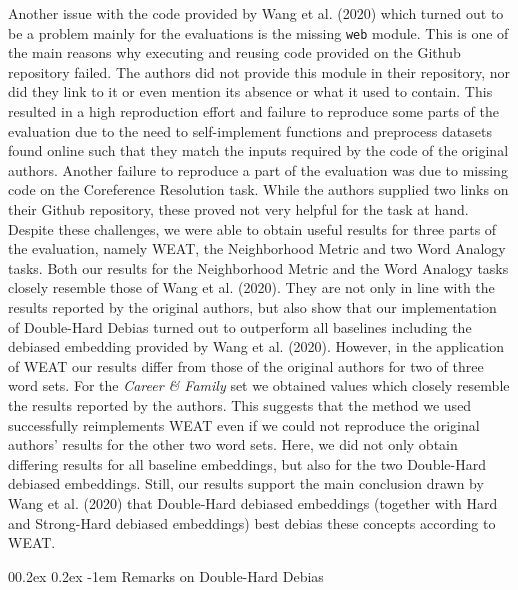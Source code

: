 \documentclass[
  english,
  man,floatsintext]{apa6}
\makeatletter
\let\oldparagraph\paragraph
\renewcommand{\paragraph}[1]{\oldparagraph{#1}\mbox{}}
\renewcommand{\paragraph}{\@startsection{paragraph}{4}{\parindent}%
  {0\baselineskip \@plus 0.2ex \@minus 0.2ex}%
  {-1em}%
  {\normalfont\normalsize\bfseries\itshape\typesectitle}}
\makeatother
\begin{document}
Another issue with the code provided by Wang et al. (2020) which turned out to be a problem mainly for the evaluations is the missing \texttt{web} module. This is one of the main reasons why executing and reusing code provided on the Github repository failed. The authors did not provide this module in their repository, nor did they link to it or even mention its absence or what it used to contain. This resulted in a high reproduction effort and failure to reproduce some parts of the evaluation due to the need to self-implement functions and preprocess datasets found online such that they match the inputs required by the code of the original authors.
Another failure to reproduce a part of the evaluation was due to missing code on the Coreference Resolution task. While the authors supplied two links on their Github repository, these proved not very helpful for the task at hand.
Despite these challenges, we were able to obtain useful results for three parts of the evaluation, namely WEAT, the Neighborhood Metric and two Word Analogy tasks. Both our results for the Neighborhood Metric and the Word Analogy tasks closely resemble those of Wang et al. (2020). They are not only in line with the results reported by the original authors, but also show that our implementation of Double-Hard Debias turned out to outperform all baselines including the debiased embedding provided by Wang et al. (2020). However, in the application of WEAT our results differ from those of the original authors for two of three word sets. For the \emph{Career \& Family} set we obtained values which closely resemble the results reported by the authors. This suggests that the method we used successfully reimplements WEAT even if we could not reproduce the original authors' results for the other two word sets. Here, we did not only obtain differing results for all baseline embeddings, but also for the two Double-Hard debiased embeddings. Still, our results support the main conclusion drawn by Wang et al. (2020) that Double-Hard debiased embeddings (together with Hard and Strong-Hard debiased embeddings) best debias these concepts according to WEAT.
\newpage

\hypertarget{remarks-on-double-hard-debias}{%
\paragraph{Remarks on Double-Hard Debias}\label{remarks-on-double-hard-debias}}
\end{document}
